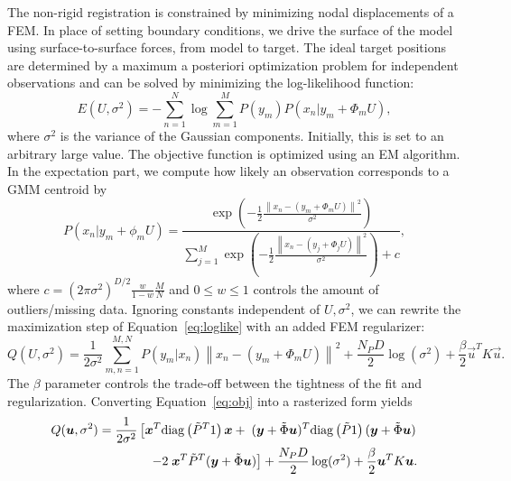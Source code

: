 \documentclass[runningheads,a4paper]{llncs}
\newcommand{\trans}[1]{#1^{T}}
\newcommand{\diag}{\mathrm{diag}}
\begin{document}
\noindent The non-rigid registration is constrained by minimizing nodal displacements of a FEM. In place of setting boundary conditions, we drive the surface of the model using surface-to-surface forces, from model to target.  The ideal target positions are determined by a maximum a posteriori optimization problem for independent observations and can be solved by minimizing the log-likelihood function:
\begin{equation} \label{eq:loglike}
E(U,\sigma^2) = -\sum_{n=1}^N\log\sum_{m=1}^MP(y_m)P(x_n|y_m+\Phi_mU),
\end{equation}
where $\sigma^2$ is the variance of the Gaussian components.  Initially, this is set to an arbitrary large value. The objective function is optimized using an EM algorithm. In the expectation part, we compute how likely an observation corresponds to a GMM centroid by
\begin{equation} \label{eq:prob}
P(x_n|y_m+\phi_mU) = \frac{\exp{(-\frac{1}{2}\frac{\left\|x_n -(y_m+\Phi_mU)\right\|^2}{\sigma^2})}}{\sum_{j=1}^M\exp{(-\frac{1}{2}\frac{\left\|x_n -(y_j+\Phi_jU)\right\|^2}{\sigma^2})} + c},
\end{equation}
where $c=(2\pi\sigma^2)^{D/2}\frac{w}{1-w}\frac{M}{N}$ and $0{\leq}w{\leq}1$ controls the amount of outliers/missing data.
Ignoring constants independent of $U,\sigma^2$, we can rewrite the maximization step of Equation~\ref{eq:loglike} with an added FEM regularizer:
\begin{equation} \label{eq:obj}
Q(U,\sigma^2) = \dfrac{1}{2\sigma^2}\sum_{m,n=1}^{M,N}P(y_m|x_n)\left\|x_n- (y_m+\Phi_mU)\right\|^2 + \frac{N_PD}{2}\log(\sigma^2) +\frac{\beta}{2}\trans{\vec{u}}K\vec{u}.
\end{equation}
The $\beta$ parameter controls the trade-off between the tightness of the fit and regularization. Converting Equation~\eqref{eq:obj} into a rasterized form yields
\begin{align}\label{eq:matrixrep}
    Q(\vec{u},\sigma^2) & = \dfrac{1}{2\sigma^2}\left[ \trans{\vec{x}}\diag\left(\trans{\tilde{P}}1\right)\vec{x}+\;\trans{(\vec{y}+\tilde{\Phi}\vec{u})}\diag\left(\tilde{P}1\right)(\vec{y}+\tilde{\Phi}\vec{u})\right.\notag\\
    & \qquad\qquad \left.-2\;\trans{\vec{x}}\trans{\tilde{P}}(\vec{y}+\tilde{\Phi}\vec{u})\right] +\dfrac{N_PD}{2}\log(\sigma^2) + \dfrac{\beta}{2}\trans{\vec{u}}K\vec{u}.
\end{align}
\end{document}
